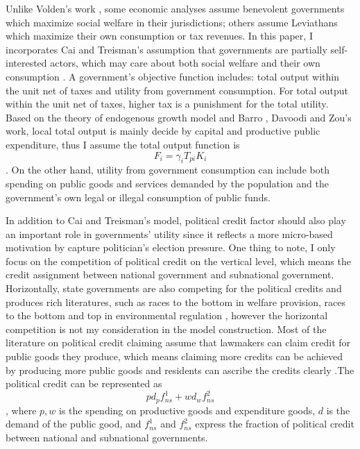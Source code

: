 Unlike Volden's work \cite{volden2007intergovernmental}, some economic analyses assume benevolent governments which maximize social welfare in their jurisdictions; others assume Leviathans which maximize their own consumption or tax revenues. In this paper, I incorporates Cai and Treisman's \cite{cai2005does} assumption that  governments are partially self-interested actors, which may care about both social welfare and their own consumption \cite{edwards1996tax}. A government’s objective function includes: total output within the unit net of taxes and  utility from government consumption. For total output within the unit net of taxes, higher tax is a punishment for the total utility. Based on the theory of endogenous growth model and Barro \cite{barro1990government}, Davoodi and Zou's \cite{davoodi1998fiscal} work, local total output is mainly decide by capital and productive public expenditure, thus I assume the total output function is $$F_i = \gamma_i T_{pi} K_i $$. On the other hand, utility from government consumption can include both spending on public goods and services demanded by the population and the government’s own legal or illegal consumption of public funds.

In addition to Cai and Treisman's model, political credit factor should also play an important role in governments' utility since it reflects a more micro-based motivation by capture politician's election pressure. One thing to note, I only focus on the competition of political credit on the vertical level, which means the credit assignment between national government and subnational government. Horizontally, state governments are also competing for the political credits and produces rich literatures, such as races to the bottom in welfare provision, races to the bottom and top in environmental regulation \cite{zimmerman1996interstate,zimmerman2012interstate,woods2006interstate,bailey2004wider}, however the horizontal competition is not my consideration in the model construction. Most of the literature on political credit claiming assume that lawmakers can claim credit for public goods they produce, which means claiming more credits can be achieved by producing more public goods and residents can ascribe the credits clearly \cite{volden2007intergovernmental,stein1990economic,schneider2003public,schneider2008citizen}.The political credit can be represented as $$p d_p f^1_{ns} + w d_w f^2_{ns}$$, where $p,w$ is the spending on productive goods and expenditure goods,  $d$ is the demand of the public good, and $f^1_{ns}$ and $f^2_{ns}$ express the fraction of political credit between national and subnational governments. \label{demand}


